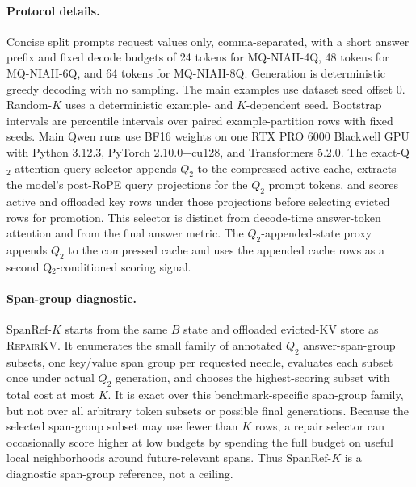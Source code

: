 \documentclass{article}
\newcommand{\repairkv}{\textsc{RepairKV}}
\newcommand{\spanref}{\ensuremath{\mathrm{SpanRef}\mbox{-}K}}
\begin{document}
\paragraph{Protocol details.}
Concise split prompts request values only, comma-separated, with a short
answer prefix and fixed decode budgets of 24 tokens for MQ-NIAH-4Q,
48 tokens for MQ-NIAH-6Q, and 64 tokens for MQ-NIAH-8Q.
Generation is deterministic greedy decoding with no sampling.
The main examples use dataset seed offset 0.
Random-$K$ uses a
deterministic example- and $K$-dependent seed.
Bootstrap intervals are percentile intervals over paired
example-partition rows with fixed seeds.
Main Qwen runs use BF16 weights on one RTX PRO 6000 Blackwell GPU with
Python 3.12.3, PyTorch 2.10.0+cu128, and Transformers 5.2.0.
The exact-Q$_2$ attention-query selector appends $Q_2$ to
the compressed active cache, extracts the model's post-RoPE query
projections for the $Q_2$ prompt tokens, and scores active and offloaded
key rows under those projections before selecting evicted rows for
promotion. This selector is distinct from decode-time answer-token
attention and from the final answer metric. The $Q_2$-appended-state proxy
appends $Q_2$ to the compressed cache and uses the appended cache rows as
a second Q$_2$-conditioned scoring signal.

\paragraph{Span-group diagnostic.}
\spanref{} starts from the same $B$ state and offloaded evicted-KV store
as \repairkv{}.
It enumerates the small family of annotated $Q_2$ answer-span-group
subsets, one key/value span group per requested needle, evaluates each
subset once under actual $Q_2$ generation, and chooses the
highest-scoring subset with total cost at most $K$.
It is exact over this benchmark-specific span-group family, but not over
all arbitrary token subsets or possible final generations.
Because the selected span-group subset may use fewer than $K$ rows, a
repair selector can occasionally score higher at low budgets by spending
the full budget on useful local neighborhoods around future-relevant
spans. Thus \spanref{} is a diagnostic span-group reference, not a
ceiling. 
\end{document}
